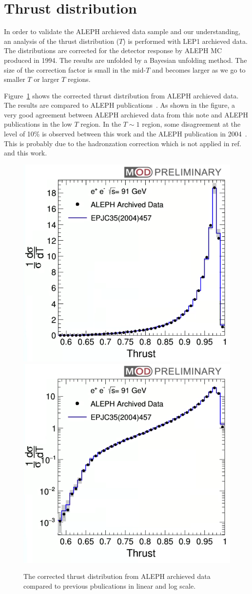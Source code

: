 \section{Thrust distribution}

In order to validate the ALEPH archieved data sample and our understanding,
an analysis of the thrust distribution ($T$) is performed with LEP1 archieved
data. The distributions are corrected for the detector response by ALEPH MC
produced in 1994. The results are unfolded by a Bayesian unfolding method. The size of the correction factor is small in the mid-$T$
and becomes larger as we go to smaller $T$ or larger $T$ regions.


Figure~\ref{fig:ThrustResults} shows the corrected thrust distribution from ALEPH archieved data. The results are compared to ALEPH
publications~\cite{Barate:1996fi,heister:2003aj}. As shown in the figure, a very good agreement between ALEPH archieved data from this note
and ALEPH publications in the low $T$ region. In the $T\sim 1$ region, some disagreement at the level of 10\% is observed between this work
and the ALEPH publication in 2004~\cite{heister:2003aj}. This is probably due to the hadronzation correction which is not applied in
ref.~\cite{Barate:1996fi} and this work. 


\begin{figure}[H]
\centering
\includegraphics[width=.49\textwidth]{images/Thrust/ThrustResult.png}
\includegraphics[width=.49\textwidth]{images/Thrust/ThrustResultLogY.png}
\caption{The corrected thrust distribution from ALEPH archieved data compared to previous pbulications in linear and log scale.}
\label{fig:ThrustResults}
\end{figure}
